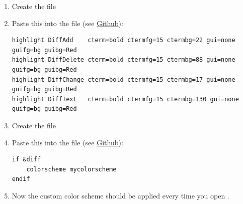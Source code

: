 \begin{enumerate}[a)]
\begin{enumerate}[1.]
        \item Create the file 
        
        \item Paste this into the file (see \href{https://github.com/robinhellmers/computer_setup/blob/master/vimdiff_colors/vim/colors/mycolorscheme.vim}{Github}):
\begin{verbatim}
highlight DiffAdd    cterm=bold ctermfg=15 ctermbg=22 gui=none guifg=bg guibg=Red
highlight DiffDelete cterm=bold ctermfg=15 ctermbg=88 gui=none guifg=bg guibg=Red
highlight DiffChange cterm=bold ctermfg=15 ctermbg=17 gui=none guifg=bg guibg=Red
highlight DiffText   cterm=bold ctermfg=15 ctermbg=130 gui=none guifg=bg guibg=Red
\end{verbatim}
        
        \item Create the file 
        
        \item Paste this into the file (see \href{https://github.com/robinhellmers/computer_setup/blob/master/vimdiff_colors/vimrc}{Github}):
\begin{verbatim}
if &diff
    colorscheme mycolorscheme
endif
\end{verbatim}
        
        \item Now the custom color scheme should be applied every time you open .
    \end{enumerate}
    
\end{enumerate}


